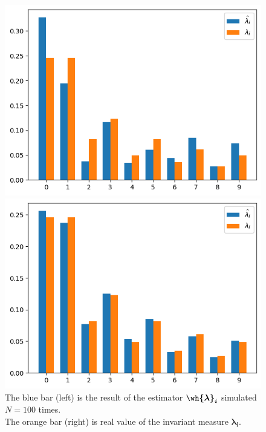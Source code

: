 \begin{figure}[H]
    \centering
    \begin{minipage}[b]{0.49\textwidth}
        \centering
        \includegraphics[width=\textwidth]{../pictures/2.e.6.png}
        \caption*{$N = 100,\; T = 100$}
    \end{minipage}
    \hfill
    \begin{minipage}[b]{0.49\textwidth}
        \centering
        \includegraphics[width=\textwidth]{../pictures/2.e.5.png}
        \caption*{$N = 100,\; T = 1000$}
    \end{minipage}
    \caption*{The {\color{blue} blue bar (left)} is the result of the estimator {\color{blue}$\boldsymbol{\wh{\lambda}_i}$} simulated $N = 100$ times.\\ The {\color{red} orange bar (right)} is real value of the invariant measure {\color{red}$\boldsymbol{\lambda_i}$}. }
\end{figure}

